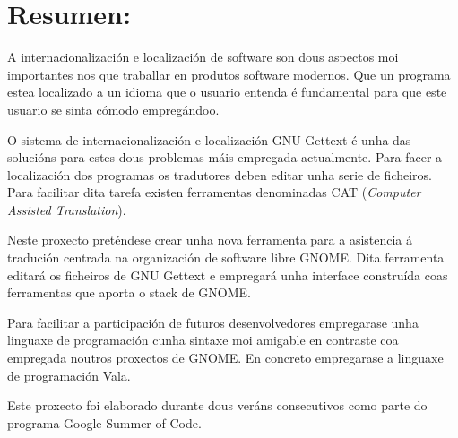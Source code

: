 %
%

\section*{Resumen:}

A internacionalización e localización de software son dous aspectos moi importantes nos que traballar en produtos software modernos. Que un programa estea localizado a un idioma que o usuario entenda é fundamental para que este usuario se sinta cómodo empregándoo.

O sistema de internacionalización e localización GNU Gettext é unha das solucións para estes dous problemas máis empregada actualmente. Para facer a localización dos programas os tradutores deben editar unha serie de ficheiros. Para facilitar dita tarefa existen ferramentas denominadas CAT (\emph{Computer Assisted Translation}).

Neste proxecto preténdese crear unha nova ferramenta para a asistencia á tradución centrada na organización de software libre GNOME. Dita ferramenta editará os ficheiros de GNU Gettext e empregará unha interface construída coas ferramentas que aporta o stack de GNOME.

Para facilitar a participación de futuros desenvolvedores empregarase unha linguaxe de programación cunha sintaxe moi amigable en contraste coa empregada noutros proxectos de GNOME. En concreto empregarase a linguaxe de programación Vala.

Este proxecto foi elaborado durante dous veráns consecutivos como parte do programa Google Summer of Code.

